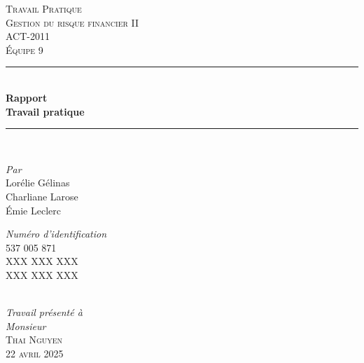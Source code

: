 \begin{titlepage}

\newcommand{\HRule}{\rule{\linewidth}{0.5mm}} %

\center %
\textsc{\LARGE Travail Pratique}\\[1.0cm]
\textsc{\Large Gestion du risque financier II}\\[0.2cm]
\textsc{\large ACT-2011}\\[0.7cm]
\textsc{\large Équipe 9}\\[0.7cm]

\HRule \\[0.4cm]
{ \Large \bfseries Rapport}\\[0.20cm] { \huge \bfseries Travail pratique}\\[0.20cm]

\HRule \\[2cm]

\begin{minipage}{0.4\textwidth}
    \begin{flushleft} \large
    \emph{Par}\\
        Lorélie Gélinas \textsc{}\\
        Charliane Larose \textsc{}\\
        Émie Leclerc \textsc{}
    \end{flushleft}
\end{minipage}%
\begin{minipage}{0.4\textwidth}
    \begin{flushright} \large
    \emph{Numéro d'identification}\\
        537 005 871\\
        XXX XXX XXX\\
        XXX XXX XXX\\
    \end{flushright}
\end{minipage} \\[1.0cm]

\emph{Travail présenté à} \\
\emph{Monsieur} \\[0.1cm]
\textsc{\Large Thai \textsc{Nguyen}}\\[1.0cm]

\textsc{\large 22 avril 2025}\\[1cm]
 
\vfill %

\end{titlepage}